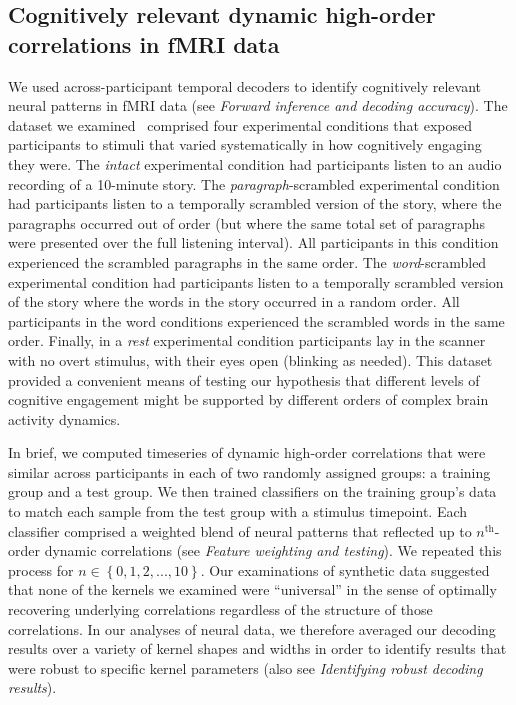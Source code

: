 \documentclass[english]{article}
\begin{document}
\subsection*{Cognitively relevant dynamic high-order correlations in
  fMRI data}
We used across-participant temporal decoders to identify cognitively
relevant neural patterns in fMRI data (see \textit{Forward inference
  and decoding accuracy}).  The dataset we examined~\citep[collected
by][]{SimoEtal16} comprised four experimental conditions that exposed
participants to stimuli that varied systematically in how cognitively
engaging they were.  The \textit{intact} experimental condition had
participants listen to an audio recording of a 10-minute story.  The
\textit{paragraph}-scrambled experimental condition had participants
listen to a temporally scrambled version of the story, where the
paragraphs occurred out of order (but where the same total set of
paragraphs were presented over the full listening interval).  All
participants in this condition experienced the scrambled paragraphs in
the same order.  The \textit{word}-scrambled experimental condition
had participants listen to a temporally scrambled version of the story
where the words in the story occurred in a random order.  All
participants in the word conditions experienced the scrambled words in
the same order.  Finally, in a \textit{rest} experimental condition
participants lay in the scanner with no overt stimulus, with their
eyes open (blinking as needed).  This dataset provided a convenient
means of testing our hypothesis that different levels of cognitive
engagement might be supported by different orders of complex brain
activity dynamics.

In brief, we computed timeseries of dynamic high-order correlations
that were similar across participants in each of two randomly assigned
groups: a training group and a test group.  We then trained
classifiers on the training group's data to match each sample from the
test group with a stimulus timepoint.  Each classifier comprised a
weighted blend of neural patterns that reflected up to
$n^\mathrm{th}$-order dynamic correlations (see \textit{Feature
  weighting and testing}).  We repeated this process for
$n \in \left\{ 0, 1, 2, ..., 10 \right\}$.  Our examinations of synthetic
data suggested that none of the kernels we examined were ``universal''
in the sense of optimally recovering underlying correlations
regardless of the structure of those correlations.  In our analyses of
neural data, we therefore averaged our decoding results over a variety
of kernel shapes and widths in order to identify results that were
robust to specific kernel parameters (also see \textit{Identifying
  robust decoding results}).
\end{document}
